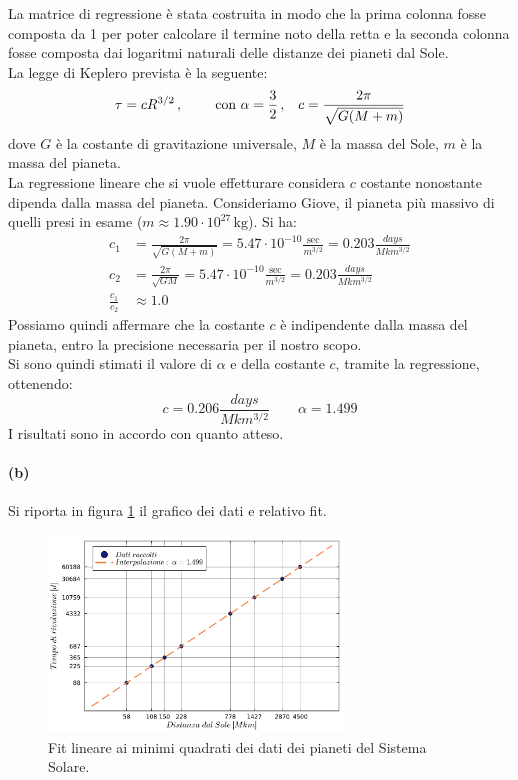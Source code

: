 \documentclass[letterpaper, 12pt]{article}
\numberwithin{equation}{section}    %
\begin{document}
La matrice di regressione è stata costruita in modo che la prima colonna fosse composta da 1 per poter calcolare
il termine noto della retta e la seconda colonna fosse composta dai logaritmi naturali delle
distanze dei pianeti dal Sole. \\
La legge di Keplero prevista è la seguente:
\begin{equation}
    \label{eq:keplero}
    \tau = c R^{3/2}\,, \qquad \text{ con } \alpha = \frac{3}{2}\,, \hspace{0.3cm} c = \frac{2\pi}{\sqrt{G (M+m)}}
\end{equation}
dove $G$ è la costante di gravitazione universale, $M$ è la massa del Sole, $m$ è la massa del pianeta. \\
La regressione lineare che si vuole effetturare considera $c$ costante nonostante dipenda dalla massa del pianeta.
Consideriamo Giove, il pianeta più massivo di quelli presi in esame ($m \approx 1.90 \cdot 10^{27} \, \text{kg}$). Si ha:
\begin{align*}
    c_1 &= \frac{2\pi}{\sqrt{G (M+m)}} = 5.47 \cdot 10^{-10} \frac{\text{sec}}{m^{3/2}} = 0.203 \frac{days}{Mkm^{3/2}}  \\
    c_2 &= \frac{2\pi}{\sqrt{G M}}   = 5.47 \cdot 10^{-10} \frac{\text{sec}}{m^{3/2}} = 0.203 \frac{days}{Mkm^{3/2}}    \\
    \frac{c_1}{c_2} &\approx 1.0
\end{align*}
Possiamo quindi affermare che la costante $c$ è indipendente dalla massa del pianeta, entro la precisione 
necessaria per il nostro scopo. \\
Si sono quindi stimati il valore di $\alpha$ e della costante $c$, tramite la regressione, ottenendo:
\begin{equation*}
    c = 0.206 \frac{days}{Mkm^{3/2}}
    \qquad
    \alpha = 1.499
\end{equation*}
I risultati sono in accordo con quanto atteso.

\paragraph{(b)}Si riporta in figura \ref{fig:es2_6_2_1} il grafico dei dati e relativo fit.
\begin{figure}[!ht]
    \centering
    \includegraphics[width=0.7\textwidth]{2621.pdf}
    \caption{Fit lineare ai minimi quadrati dei dati dei pianeti del Sistema Solare.}
    \label{fig:es2_6_2_1}
\end{figure}
\end{document}
